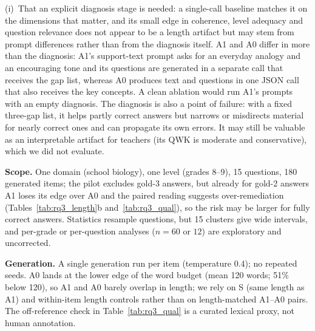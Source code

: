 (i)~That an explicit diagnosis stage is needed: a single-call baseline matches it on the dimensions that matter, and its small edge in coherence, level adequacy and question relevance does not appear to be a length artifact but may stem from prompt differences rather than from the diagnosis itself. A1 and A0 differ in more than the diagnosis: A1's support-text prompt asks for an everyday analogy and an encouraging tone and its questions are generated in a separate call that receives the gap list, whereas A0 produces text and questions in one JSON call that also receives the key concepts. A clean ablation would run A1's prompts with an empty diagnosis. The diagnosis is also a point of failure: with a fixed three-gap list, it helps partly correct answers but narrows or misdirects material for nearly correct ones and can propagate its own errors. It may still be valuable as an interpretable artifact for teachers (its QWK is moderate and conservative), which we did not evaluate.

\textbf{Scope.} One domain (school biology), one level (grades 8--9), 15 questions, 180 generated items; the pilot excludes gold-3 answers, but already for gold-2 answers A1 loses its edge over A0 and the paired reading suggests over-remediation (Tables~\ref{tab:rq3_length}b and~\ref{tab:rq3_qual}), so the risk may be larger for fully correct answers. Statistics resample questions, but 15 clusters give wide intervals, and per-grade or per-question analyses ($n{=}60$ or $12$) are exploratory and uncorrected.

\textbf{Generation.} A single generation run per item (temperature 0.4); no repeated seeds. A0 lands at the lower edge of the word budget (mean 120 words; 51\% below 120), so A1 and A0 barely overlap in length; we rely on S (same length as A1) and within-item length controls rather than on length-matched A1--A0 pairs. The off-reference check in Table~\ref{tab:rq3_qual} is a curated lexical proxy, not human annotation.

